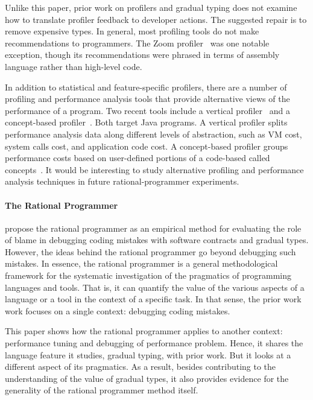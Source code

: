 Unlike this paper, prior work on profilers and gradual typing does not
examine how to translate profiler feedback to developer actions.
The suggested repair is to remove expensive types.
In general, most profiling tools do not make recommendations to
programmers. The Zoom profiler~\cite{zoom} was one
notable exception, though its recommendations were phrased in
terms of assembly language rather than high-level code.

In addition to statistical and feature-specific profilers, there are a
number of profiling and performance analysis tools that provide
alternative views of the performance of a program. Two recent tools include
a vertical profiler~\cite{vertical-profiler} and a
concept-based profiler~\cite{java-profile-concepts}.
Both target Java programs.
A vertical profiler splits performance analysis data   along different
levels of abstraction, such as VM cost, system calls cost, and application
code cost. A concept-based profiler groups performance costs based on
user-defined portions of a code-based called concepts~\cite{concepts}.
It would be interesting to study alternative profiling and performance
analysis techniques in future rational-programmer experiments.


\paragraph{The Rational Programmer}

 \citet{lksfd-popl-2020,lgfd-icfp-2021} propose the rational programmer as
 an empirical method for evaluating the role of blame in debugging coding
 mistakes with software contracts and gradual types. However, the ideas
 behind the rational programmer go beyond debugging such mistakes. In
 essence, the rational programmer is a general methodological framework
 for the systematic investigation of the pragmatics of programming
 languages and tools. That is, it can quantify the value of the various
 aspects of a language or a tool in the context of a specific task. In
 that sense, the prior work work focuses on a single context: debugging
 coding mistakes.

 This paper shows how the rational programmer applies
 to another context: performance tuning and debugging of performance
 problem. Hence, it shares the language feature it studies, gradual
 typing, with prior work. But it looks at a different aspect
 of its pragmatics. As a result, besides contributing to the understanding
 of the value of gradual types, it also provides evidence for the
 generality of the rational programmer method itself.


